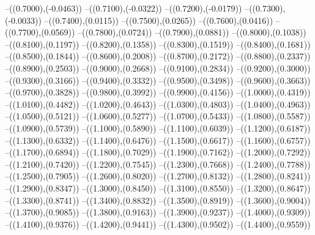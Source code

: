 {	--({\sx*(0.7000)},{\sy*(-0.0463)})
	--({\sx*(0.7100)},{\sy*(-0.0322)})
	--({\sx*(0.7200)},{\sy*(-0.0179)})
	--({\sx*(0.7300)},{\sy*(-0.0033)})
	--({\sx*(0.7400)},{\sy*(0.0115)})
	--({\sx*(0.7500)},{\sy*(0.0265)})
	--({\sx*(0.7600)},{\sy*(0.0416)})
	--({\sx*(0.7700)},{\sy*(0.0569)})
	--({\sx*(0.7800)},{\sy*(0.0724)})
	--({\sx*(0.7900)},{\sy*(0.0881)})
	--({\sx*(0.8000)},{\sy*(0.1038)})
	--({\sx*(0.8100)},{\sy*(0.1197)})
	--({\sx*(0.8200)},{\sy*(0.1358)})
	--({\sx*(0.8300)},{\sy*(0.1519)})
	--({\sx*(0.8400)},{\sy*(0.1681)})
	--({\sx*(0.8500)},{\sy*(0.1844)})
	--({\sx*(0.8600)},{\sy*(0.2008)})
	--({\sx*(0.8700)},{\sy*(0.2172)})
	--({\sx*(0.8800)},{\sy*(0.2337)})
	--({\sx*(0.8900)},{\sy*(0.2503)})
	--({\sx*(0.9000)},{\sy*(0.2668)})
	--({\sx*(0.9100)},{\sy*(0.2834)})
	--({\sx*(0.9200)},{\sy*(0.3000)})
	--({\sx*(0.9300)},{\sy*(0.3166)})
	--({\sx*(0.9400)},{\sy*(0.3332)})
	--({\sx*(0.9500)},{\sy*(0.3498)})
	--({\sx*(0.9600)},{\sy*(0.3663)})
	--({\sx*(0.9700)},{\sy*(0.3828)})
	--({\sx*(0.9800)},{\sy*(0.3992)})
	--({\sx*(0.9900)},{\sy*(0.4156)})
	--({\sx*(1.0000)},{\sy*(0.4319)})
	--({\sx*(1.0100)},{\sy*(0.4482)})
	--({\sx*(1.0200)},{\sy*(0.4643)})
	--({\sx*(1.0300)},{\sy*(0.4803)})
	--({\sx*(1.0400)},{\sy*(0.4963)})
	--({\sx*(1.0500)},{\sy*(0.5121)})
	--({\sx*(1.0600)},{\sy*(0.5277)})
	--({\sx*(1.0700)},{\sy*(0.5433)})
	--({\sx*(1.0800)},{\sy*(0.5587)})
	--({\sx*(1.0900)},{\sy*(0.5739)})
	--({\sx*(1.1000)},{\sy*(0.5890)})
	--({\sx*(1.1100)},{\sy*(0.6039)})
	--({\sx*(1.1200)},{\sy*(0.6187)})
	--({\sx*(1.1300)},{\sy*(0.6332)})
	--({\sx*(1.1400)},{\sy*(0.6476)})
	--({\sx*(1.1500)},{\sy*(0.6617)})
	--({\sx*(1.1600)},{\sy*(0.6757)})
	--({\sx*(1.1700)},{\sy*(0.6894)})
	--({\sx*(1.1800)},{\sy*(0.7029)})
	--({\sx*(1.1900)},{\sy*(0.7162)})
	--({\sx*(1.2000)},{\sy*(0.7292)})
	--({\sx*(1.2100)},{\sy*(0.7420)})
	--({\sx*(1.2200)},{\sy*(0.7545)})
	--({\sx*(1.2300)},{\sy*(0.7668)})
	--({\sx*(1.2400)},{\sy*(0.7788)})
	--({\sx*(1.2500)},{\sy*(0.7905)})
	--({\sx*(1.2600)},{\sy*(0.8020)})
	--({\sx*(1.2700)},{\sy*(0.8132)})
	--({\sx*(1.2800)},{\sy*(0.8241)})
	--({\sx*(1.2900)},{\sy*(0.8347)})
	--({\sx*(1.3000)},{\sy*(0.8450)})
	--({\sx*(1.3100)},{\sy*(0.8550)})
	--({\sx*(1.3200)},{\sy*(0.8647)})
	--({\sx*(1.3300)},{\sy*(0.8741)})
	--({\sx*(1.3400)},{\sy*(0.8832)})
	--({\sx*(1.3500)},{\sy*(0.8919)})
	--({\sx*(1.3600)},{\sy*(0.9004)})
	--({\sx*(1.3700)},{\sy*(0.9085)})
	--({\sx*(1.3800)},{\sy*(0.9163)})
	--({\sx*(1.3900)},{\sy*(0.9237)})
	--({\sx*(1.4000)},{\sy*(0.9309)})
	--({\sx*(1.4100)},{\sy*(0.9376)})
	--({\sx*(1.4200)},{\sy*(0.9441)})
	--({\sx*(1.4300)},{\sy*(0.9502)})
	--({\sx*(1.4400)},{\sy*(0.9559)})
}
